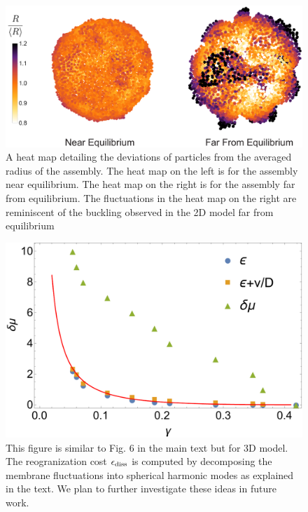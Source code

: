 \documentclass[amsmath,preprintnumbers,10pt,nofootinbib,prl,twocolumn]{revtex4-1}
\begin{document}
\begin{figure}
\includegraphics[width=1\linewidth,angle=0]{Fig11.pdf}
\caption{ A heat map detailing the deviations of particles from the averaged radius of the assembly. The heat map on the left is for the assembly near equilibrium. The heat map on the right is for the assembly far from equilibrium. The fluctuations in the heat map on the right are reminiscent of the buckling observed in the 2D model far from equilibrium}
\label{fig:relativeradius3D}
\end{figure}
\begin{figure}
\includegraphics[width=1\linewidth,angle=0]{Fig12.pdf}
\caption{ This figure is similar to Fig. 6 in the main text but for 3D model. The reogranization cost $\epsilon_{\rm diss}$ is computed by decomposing the membrane fluctuations into spherical harmonic modes as explained in the text. We plan to further investigate these ideas in future work.}
\label{fig:boundsof3Dmembrane}
\end{figure}

\end{document}
